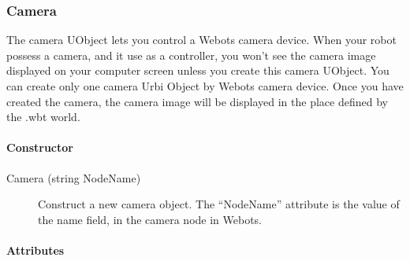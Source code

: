 \subsubsection{Camera}

   The camera UObject lets you control a Webots camera device. When your robot
  possess a camera, and it use
  \urbi as a controller, you won't see the camera image displayed on your computer
  screen unless you create this camera UObject. You can create only one
  camera Urbi Object by Webots camera device. Once you have created the camera,
  the camera image will be displayed in the place defined by the .wbt world.


\paragraph{Constructor}

\noindent
\begin{description}
\item[{Camera (string NodeName)}] Construct a new camera object. The ``NodeName'' attribute is the value
          of the name field, in the camera node in Webots.

\end{description}

\paragraph{Attributes}

